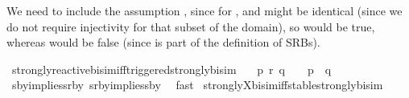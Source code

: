 \begin{isabellebody}
\begin{isamarkuptext}
We need to include the assumption , since for ,  and  might be identical (since we do not require injectivity for that subset of the domain), so  would be true, whereas  would be false (since  is part of the definition of SRBs).%
\end{isamarkuptext}\isamarkuptrue%
%
\isadelimdocument
%
\endisadelimdocument
%
\isatagdocument
%
\isamarkuptrue%
%
\endisatagdocument
{\isafolddocument}%
%
\isadelimdocument
%
\endisadelimdocument
%
\isadelimvisible
%
\endisadelimvisible
%
\isatagvisible
{}\isamarkupfalse%
\ strongly{\isacharunderscore}{\kern0pt}reactive{\isacharunderscore}{\kern0pt}bisim{\isacharunderscore}{\kern0pt}iff{\isacharunderscore}{\kern0pt}triggered{\isacharunderscore}{\kern0pt}strongly{\isacharunderscore}{\kern0pt}bisim{\isacharcolon}{\kern0pt}\isanewline
\ \ \ {\isacartoucheopen}p\ {\isasymleftrightarrow}\isactrlsub r\ q\ \ {\isasymLongleftrightarrow}\ \ {\isasymtheta}{\isacharparenleft}{\kern0pt}p{\isacharparenright}{\kern0pt}\ {\isasymleftrightarrow}\ {\isasymtheta}{\isacharparenleft}{\kern0pt}q{\isacharparenright}{\kern0pt}{\isacartoucheclose}\isanewline
\ \ \isamarkupfalse%
\ sby{\isacharunderscore}{\kern0pt}implies{\isacharunderscore}{\kern0pt}srby\ srby{\isacharunderscore}{\kern0pt}implies{\isacharunderscore}{\kern0pt}sby\ \isamarkupfalse%
\ fast\isanewline
\isanewline
{}\isamarkupfalse%
\ strongly{\isacharunderscore}{\kern0pt}X{\isacharunderscore}{\kern0pt}bisim{\isacharunderscore}{\kern0pt}iff{\isacharunderscore}{\kern0pt}stable{\isacharunderscore}{\kern0pt}strongly{\isacharunderscore}{\kern0pt}bisim{\isacharcolon}{\kern0pt}\isanewline

\end{isabellebody}
